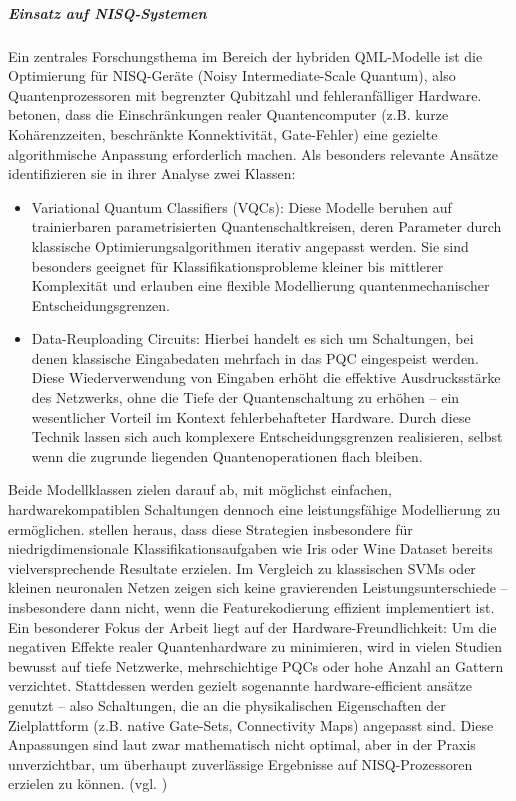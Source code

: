 \subparagraph{Einsatz auf NISQ-Systemen}
Ein zentrales Forschungsthema im Bereich der hybriden QML-Modelle ist die Optimierung für NISQ-Geräte (Noisy Intermediate-Scale Quantum), also Quantenprozessoren mit begrenzter Qubitzahl und fehleranfälliger Hardware. \cite{gujjuQuantumMachineLearning2024} betonen, dass die Einschränkungen realer Quantencomputer (z.B. kurze Kohärenzzeiten, beschränkte Konnektivität, Gate-Fehler) eine gezielte algorithmische Anpassung erforderlich machen. Als besonders relevante Ansätze identifizieren sie in ihrer Analyse zwei Klassen:
\begin{itemize}
  \item Variational Quantum Classifiers (VQCs): Diese Modelle beruhen auf trainierbaren parametrisierten Quantenschaltkreisen, deren Parameter durch klassische Optimierungsalgorithmen iterativ angepasst werden. Sie sind besonders geeignet für Klassifikationsprobleme kleiner bis mittlerer Komplexität und erlauben eine flexible Modellierung quantenmechanischer Entscheidungsgrenzen.
  \vspace{0.5em}
  \item Data-Reuploading Circuits: Hierbei handelt es sich um Schaltungen, bei denen klassische Eingabedaten mehrfach in das PQC eingespeist werden. Diese Wiederverwendung von Eingaben erhöht die effektive Ausdrucksstärke des Netzwerks, ohne die Tiefe der Quantenschaltung zu erhöhen – ein wesentlicher Vorteil im Kontext fehlerbehafteter Hardware. Durch diese Technik lassen sich auch komplexere Entscheidungsgrenzen realisieren, selbst wenn die zugrunde liegenden Quantenoperationen flach bleiben.
\end{itemize}
Beide Modellklassen zielen darauf ab, mit möglichst einfachen, hardwarekompatiblen Schaltungen dennoch eine leistungsfähige Modellierung zu ermöglichen. \cite{gujjuQuantumMachineLearning2024} stellen heraus, dass diese Strategien insbesondere für niedrigdimensionale Klassifikationsaufgaben wie Iris oder Wine Dataset bereits vielversprechende Resultate erzielen. Im Vergleich zu klassischen SVMs oder kleinen neuronalen Netzen zeigen sich keine gravierenden Leistungsunterschiede – insbesondere dann nicht, wenn die Featurekodierung effizient implementiert ist.
Ein besonderer Fokus der Arbeit liegt auf der Hardware-Freundlichkeit: Um die negativen Effekte realer Quantenhardware zu minimieren, wird in vielen Studien bewusst auf tiefe Netzwerke, mehrschichtige PQCs oder hohe Anzahl an Gattern verzichtet. Stattdessen werden gezielt sogenannte hardware-efficient ansätze genutzt – also Schaltungen, die an die physikalischen Eigenschaften der Zielplattform (z.B. native Gate-Sets, Connectivity Maps) angepasst sind. Diese Anpassungen sind laut \cite{gujjuQuantumMachineLearning2024} zwar mathematisch nicht optimal, aber in der Praxis unverzichtbar, um überhaupt zuverlässige Ergebnisse auf NISQ-Prozessoren erzielen zu können. (vgl. \cite{gujjuQuantumMachineLearning2024})


